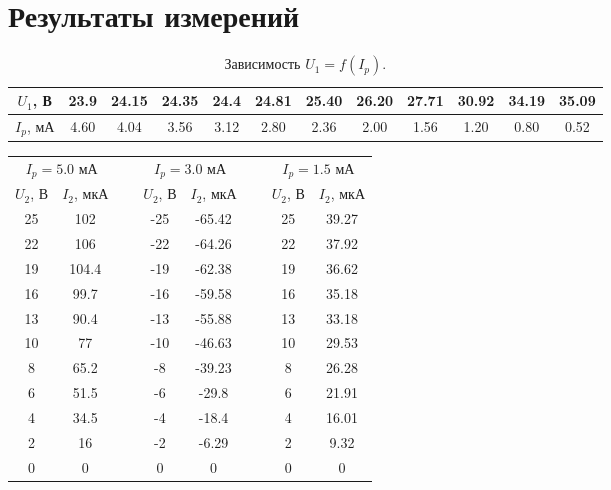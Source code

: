 \documentclass[a4paper,11pt]{extarticle} %
\begin{document}
\section*{Результаты измерений}
\begin{table}[h]
\centering
\begin{tabular}{|c|c|c|c|c|c|c|c|c|c|c|c|}
\hline
$U_1$, В & 23.9 & 24.15 & 24.35 & 24.4 & 24.81 & 25.40 & 26.20 & 27.71 & 30.92 & 34.19 & 35.09 \\ \hline
$I_p$, мА & 4.60 & 4.04  & 3.56  & 3.12 & 2.80  & 2.36  & 2.00  & 1.56  & 1.20  & 0.80  & 0.52  \\ \hline
\end{tabular}
\caption{Зависимость $U_1 = f(I_p)$.}
\end{table}


\begin{table}[h]
\centering
\begin{tabular}{|c|c|c|c|c|c|c|c|}
\cline{1-2} \cline{4-5} \cline{7-8}
\multicolumn{2}{|c|}{$I_p = 5.0$ мА} &  & \multicolumn{2}{c|}{$I_p = 3.0$ мА} &  & \multicolumn{2}{c|}{$I_p = 1.5$ мА} \\ \cline{1-2} \cline{4-5} \cline{7-8} 
$U_2$, В  & $I_2$, мкА&  & $U_2$, В & $I_2$, мкА&  & $U_2$, В  & $I_2$, мкА \\ \cline{1-2} \cline{4-5} \cline{7-8} 
25 & 102 & ~ & -25 & -65.42 & ~ & 25 & 39.27 \\ \cline{1-2} \cline{4-5} \cline{7-8}
22 & 106 & ~ & -22 & -64.26 & ~ & 22 & 37.92 \\ \cline{1-2} \cline{4-5} \cline{7-8}
19 & 104.4 & ~ & -19 & -62.38 & ~ & 19 & 36.62 \\ \cline{1-2} \cline{4-5} \cline{7-8}
16 & 99.7 & ~ & -16 & -59.58 & ~ & 16 & 35.18 \\ \cline{1-2} \cline{4-5} \cline{7-8}
13 & 90.4 & ~ & -13 & -55.88 & ~ & 13 & 33.18 \\ \cline{1-2} \cline{4-5} \cline{7-8}
10 & 77 & ~ & -10 & -46.63 & ~ & 10 & 29.53 \\ \cline{1-2} \cline{4-5} \cline{7-8}
8 & 65.2 & ~ & -8 & -39.23 & ~ & 8 & 26.28 \\ \cline{1-2} \cline{4-5} \cline{7-8}
6 & 51.5 & ~ & -6 & -29.8 & ~ & 6 & 21.91 \\ \cline{1-2} \cline{4-5} \cline{7-8}
4 & 34.5 & ~ & -4 & -18.4 & ~ & 4 & 16.01 \\ \cline{1-2} \cline{4-5} \cline{7-8}
2 & 16 & ~ & -2 & -6.29 & ~ & 2 & 9.32 \\ \cline{1-2} \cline{4-5} \cline{7-8}
0 & 0 & ~ & 0 & 0 & ~ & 0 & 0 \\ \cline{1-2} \cline{4-5} \cline{7-8}

\end{tabular}
\end{table}
\end{document}
